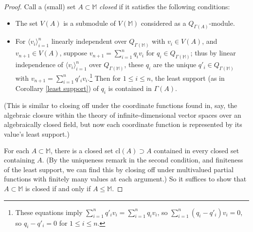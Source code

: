 \documentclass{amsart}
\theoremstyle{definition}
\theoremstyle{remark}
\numberwithin{equation}{section}
\begin{document}
\begin{proof}

Call a (small) set $A \subset \mathbb{M}$ \textit{closed} if it satisfies the following conditions:

\begin{itemize}
    \item The set $V(A)$ is a submodule of $V(\mathbb{M})$ considered as a $Q_{\Gamma(A)}$-module.

    \item For $\langle v_{i}\rangle^{n}_{i = 1}$ linearly independent over $Q_{\Gamma(\mathbb{M})}$ with $v_{i} \in V(A)$, and $v_{n+1} \in V(A)$, suppose $v_{n+1} = \sum^{n}_{i=1} q_{i}v_{i}$ for $q_{i} \in Q_{\Gamma(\mathbb{M})}$; thus by linear independence of $\langle v_{i}\rangle^{n}_{i = 1}$
    over $Q_{\Gamma(\mathbb{M})}$, these $q_{i}$ are the unique $q'_{i} \in Q_{\Gamma(\mathbb{M})}$ with $v_{n+1} = \sum^{n}_{i=1} q'_{i}v_{i}$.\footnote{These equations imply $\sum^{n}_{i=1} q'_{i}v_{i}=\sum^{n}_{i=1} q_{i}v_{i}$, so $\sum^{n}_{i=1} (q_{i}-q'_{i})v_{i}=0$, so $q_{i}-q'_{i} = 0$ for $1 \leq i \leq n$.} Then for $1 \leq i \leq n$, the least support (as in Corollary \ref{least support}) of $q_{i}$ is contained in $\Gamma(A)$.
\end{itemize}


(This is similar to closing off under the coordinate functions found in, say, the algebraic closure within the theory of infinite-dimensional vector spaces over an algebraically closed field, but now each coordinate function is represented by its value's least support.)


For each $A \subset \mathbb{M}$, there is a closed set $\mathrm{cl}(A) \supset A$ contained in every closed set containing $A$. (By the uniqueness remark in the second condition, and finiteness of the least support, we can find this by closing off under multivalued partial functions with finitely many values at each argument.) So it suffices to show that $A \subset \mathbb{M}$ is closed if and only if $A \leq \mathbb{M}$. 


\end{proof}
\end{document}
